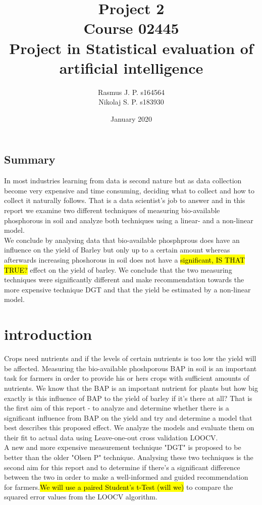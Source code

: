 \documentclass{article}
\begin{document}
\begin{titlepage}
	
	
	\title{Project 2 \\ Course 02445 \\ Project in Statistical evaluation of \\ artificial intelligence }
	\author{Rasmus J. P. s164564 \\ Nikolaj S. P. s183930}
	\date{January 2020}
	\maketitle
	
\subsection*{Summary}
In most industries learning from data is second nature but as data collection become very expensive and time consuming, deciding what to collect and how to collect it naturally follows. That is a data scientist's job to answer and in this report we examine two different techniques of measuring bio-available phosphorous in soil and analyze both techniques using a linear- and a non-linear model.\\ We conclude by analysing data that bio-available phosphprous does have an influence on the yield of Barley but only up to a certain amount whereas afterwards increasing phoshorous in soil does not have a \hl{significant, IS THAT TRUE?} effect on the yield of barley. We conclude that the two measuring techniques were significantly different and make recommendation towards the more expensive technique DGT and that the yield be estimated by a non-linear model.
	
\end{titlepage}


\section{introduction}
Crops need nutrients and if the levels of certain nutrients is too low the yield will be affected. Measuring the bio-available phoshporous BAP in soil is an important task for farmers in order to provide his or hers crops with sufficient amounts of nutrients. We know that the BAP is an important nutrient for plants but how big exactly is this influence of BAP to the yield of barley if it's there at all? That is the first aim of this report - to analyze and determine whether there is a significant influence from BAP on the yield and try and determine a model that best describes this proposed effect. We analyze the models and evaluate them on their fit to actual data using Leave-one-out cross validation LOOCV. \\ A new and more expensive measurement technique "DGT" is proposed to be better than the older "Olsen P" technique. Analysing these two techniques is the second aim for this report and to determine if there's a significant difference between the two in order to make a well-informed and guided recommendation for farmers.\hl{We will use a paired Student's t-Test (will we)} to compare the squared error values from the LOOCV algorithm.
\end{document}
